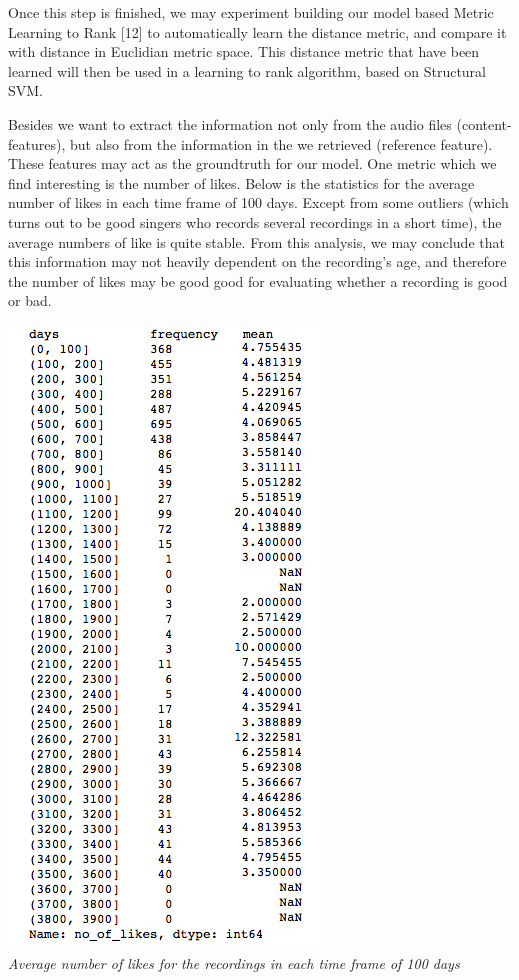 \documentclass[paper=a4, fontsize=11pt, DIV=13]{scrartcl}
\begin{document}
Once this step is finished, we may experiment building our model based Metric Learning to Rank [12] to automatically learn the distance metric, and compare it with distance in Euclidian metric space. This distance metric that have been learned will then be used in a learning to rank algorithm, based on Structural SVM.

Besides we want to extract the information not only from the audio files (content-features), but also from the information in the we retrieved (reference feature). These features may act as the groundtruth for our model. One metric which we find interesting is the number of likes.  Below is the statistics for the average number of likes in each time frame of 100 days. Except from some outliers (which turns out to be good singers who records several recordings in a short time), the average numbers of like is quite stable. From this analysis, we may conclude that this information may not heavily dependent on the recording's age, and therefore the number of likes may be good good for evaluating whether a recording is good or bad.

\begin{center}
\includegraphics[scale=0.5]{img/3.jpg}\\
\textit{Average number of likes for the recordings in each time frame of 100 days}\\
\end{center}
\end{document}
